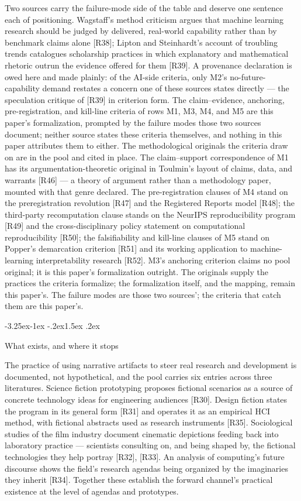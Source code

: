 \documentclass[11pt,a4paper]{article}
\makeatletter
\renewcommand\subsection{\@startsection{subsection}{2}{\z@}%
  {-3.25ex\@plus -1ex \@minus -.2ex}{1.5ex \@plus .2ex}%
  {\normalfont\large\bfseries\raggedright}}
\makeatother
\begin{document}
Two sources carry the failure-mode side of the table and deserve one sentence each of positioning. Wagstaff's method criticism argues that machine learning research should be judged by delivered, real-world capability rather than by benchmark claims alone [R38]; Lipton and Steinhardt's account of troubling trends catalogues scholarship practices in which explanatory and mathematical rhetoric outrun the evidence offered for them [R39]. A provenance declaration is owed here and made plainly: of the AI-side criteria, only M2's no-future-capability demand restates a concern one of these sources states directly — the speculation critique of [R39] in criterion form. The claim–evidence, anchoring, pre-registration, and kill-line criteria of rows M1, M3, M4, and M5 are this paper's formalization, prompted by the failure modes those two sources document; neither source states these criteria themselves, and nothing in this paper attributes them to either. The methodological originals the criteria draw on are in the pool and cited in place. The claim–support correspondence of M1 has its argumentation-theoretic original in Toulmin's layout of claims, data, and warrants [R46] — a theory of argument rather than a methodology paper, mounted with that genre declared. The pre-registration clauses of M4 stand on the preregistration revolution [R47] and the Registered Reports model [R48]; the third-party recomputation clause stands on the NeurIPS reproducibility program [R49] and the cross-disciplinary policy statement on computational reproducibility [R50]; the falsifiability and kill-line clauses of M5 stand on Popper's demarcation criterion [R51] and its working application to machine-learning interpretability research [R52]. M3's anchoring criterion claims no pool original; it is this paper's formalization outright. The originals supply the practices the criteria formalize; the formalization itself, and the mapping, remain this paper's. The failure modes are those two sources'; the criteria that catch them are this paper's.

\subsection{What exists, and where it stops}

The practice of using narrative artifacts to steer real research and development is documented, not hypothetical, and the pool carries six entries across three literatures. Science fiction prototyping proposes fictional scenarios as a source of concrete technology ideas for engineering audiences [R30]. Design fiction states the program in its general form [R31] and operates it as an empirical HCI method, with fictional abstracts used as research instruments [R35]. Sociological studies of the film industry document cinematic depictions feeding back into laboratory practice — scientists consulting on, and being shaped by, the fictional technologies they help portray [R32], [R33]. An analysis of computing's future discourse shows the field's research agendas being organized by the imaginaries they inherit [R34]. Together these establish the forward channel's practical existence at the level of agendas and prototypes.
\end{document}
